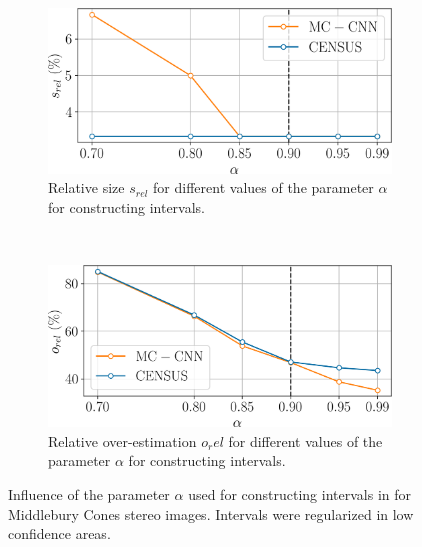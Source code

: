 \begin{figure}
    \centering
    \begin{subfigure}[t]{0.7\linewidth}
        \centering
        \includegraphics[width=\linewidth]{Images/X_Annex/ablation_study_cones_alpha_s_rel.png}
        \caption{Relative size $s_{rel}$ for different values of the parameter $\alpha$ for constructing intervals.}
        \label{fig:ablation_study_alpha_s_rel}
    \end{subfigure}\vspace*{0.3cm}\\
    \begin{subfigure}[t]{0.7\linewidth}
        \centering
        \includegraphics[width=\linewidth]{Images/X_Annex/ablation_study_cones_alpha_o_rel.png}
        \caption{Relative over-estimation $o_rel$ for different values of the parameter $\alpha$ for constructing intervals.}
        \label{fig:ablation_study_alpha_o_rel}
    \end{subfigure}
    \caption{Influence of the parameter $\alpha$ used for constructing intervals in  for Middlebury Cones stereo images. Intervals were regularized in low confidence areas.}
    \label{fig:ablation_study_alpha_2}
\end{figure}

